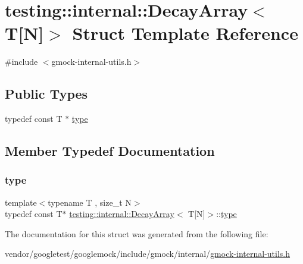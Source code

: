 \hypertarget{structtesting_1_1internal_1_1_decay_array_3_01_t[_n]_4}{}\section{testing\+:\+:internal\+:\+:Decay\+Array$<$ T\mbox{[}N\mbox{]}$>$ Struct Template Reference}
\label{structtesting_1_1internal_1_1_decay_array_3_01_t[_n]_4}


{\ttfamily \#include $<$gmock-\/internal-\/utils.\+h$>$}

\subsection*{Public Types}
\begin{DoxyCompactItemize}
\item 
typedef const T $\ast$ \hyperlink{structtesting_1_1internal_1_1_decay_array_3_01_t[_n]_4_afc22a88da484b94639501c07fb90bfd3}{type}
\end{DoxyCompactItemize}


\subsection{Member Typedef Documentation}
\mbox{\label{structtesting_1_1internal_1_1_decay_array_3_01_t[_n]_4_afc22a88da484b94639501c07fb90bfd3}} 
\subsubsection{\texorpdfstring{type}{type}}
{\footnotesize\ttfamily template$<$typename T , size\+\_\+t N$>$ \\
typedef const T$\ast$ \hyperlink{structtesting_1_1internal_1_1_decay_array}{testing\+::internal\+::\+Decay\+Array}$<$ T\mbox{[}N\mbox{]}$>$\+::\hyperlink{structtesting_1_1internal_1_1_decay_array_3_01_t[_n]_4_afc22a88da484b94639501c07fb90bfd3}{type}}



The documentation for this struct was generated from the following file\+:\begin{DoxyCompactItemize}
\item 
vendor/googletest/googlemock/include/gmock/internal/\hyperlink{gmock-internal-utils_8h}{gmock-\/internal-\/utils.\+h}\end{DoxyCompactItemize}
